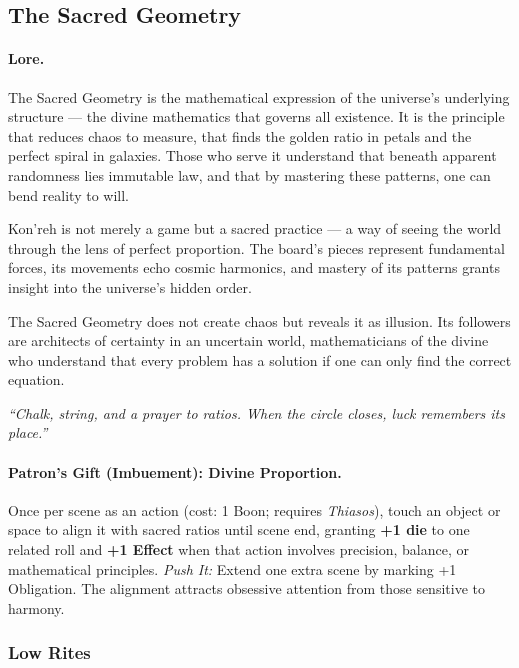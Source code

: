 \subsection{The Sacred Geometry}
\label{patron:sacred-geometry}

\paragraph{Lore.}
The Sacred Geometry is the mathematical expression of the universe's underlying structure --- the divine mathematics that governs all existence. It is the principle that reduces chaos to measure, that finds the golden ratio in petals and the perfect spiral in galaxies. Those who serve it understand that beneath apparent randomness lies immutable law, and that by mastering these patterns, one can bend reality to will.

Kon'reh is not merely a game but a sacred practice --- a way of seeing the world through the lens of perfect proportion. The board’s pieces represent fundamental forces, its movements echo cosmic harmonics, and mastery of its patterns grants insight into the universe's hidden order.

The Sacred Geometry does not create chaos but reveals it as illusion. Its followers are architects of certainty in an uncertain world, mathematicians of the divine who understand that every problem has a solution if one can only find the correct equation.

\emph{``Chalk, string, and a prayer to ratios. When the circle closes, luck remembers its place.''}

\paragraph{Patron's Gift (Imbuement): Divine Proportion.}
Once per scene as an action (cost: 1 Boon; requires \emph{Thiasos}), touch an object or space to align it with sacred ratios until scene end, granting \textbf{+1 die} to one related roll and \textbf{+1 Effect} when that action involves precision, balance, or mathematical principles.  
\emph{Push It:} Extend one extra scene by marking +1 Obligation. The alignment attracts obsessive attention from those sensitive to harmony.

\subsubsection*{Low Rites}

